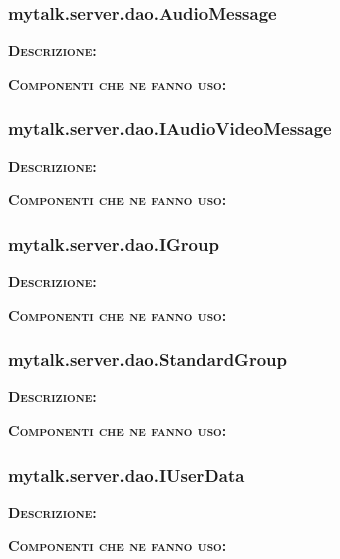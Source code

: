 \subsubsection{mytalk.server.dao.AudioMessage}
\begin{description}
	\item{\scshape\bfseries Descrizione:} 
	\item{\scshape\bfseries Componenti che ne fanno uso:} 
\end{description}

\subsubsection{mytalk.server.dao.IAudioVideoMessage}
\begin{description}
	\item{\scshape\bfseries Descrizione:} 
	\item{\scshape\bfseries Componenti che ne fanno uso:} 
\end{description}

\subsubsection{mytalk.server.dao.IGroup}
\begin{description}
	\item{\scshape\bfseries Descrizione:} 
	\item{\scshape\bfseries Componenti che ne fanno uso:} 
\end{description}

\subsubsection{mytalk.server.dao.StandardGroup}
\begin{description}
	\item{\scshape\bfseries Descrizione:} 
	\item{\scshape\bfseries Componenti che ne fanno uso:} 
\end{description}

\subsubsection{mytalk.server.dao.IUserData}
\begin{description}
	\item{\scshape\bfseries Descrizione:} 
	\item{\scshape\bfseries Componenti che ne fanno uso:} 
\end{description}

